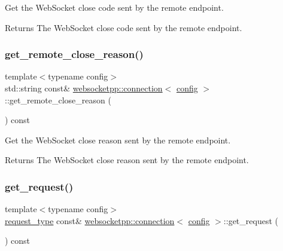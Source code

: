 Get the Web\+Socket close code sent by the remote endpoint. 

\begin{DoxyReturn}{Returns}
The Web\+Socket close code sent by the remote endpoint. 
\end{DoxyReturn}
\mbox{\label{classwebsocketpp_1_1connection_a84cba269aca634a5e7729e88b13a44c7}} 
\subsubsection{\texorpdfstring{get\+\_\+remote\+\_\+close\+\_\+reason()}{get\_remote\_close\_reason()}}
{\footnotesize\ttfamily template$<$typename config$>$ \\
std\+::string const\& \mbox{\hyperlink{classwebsocketpp_1_1connection}{websocketpp\+::connection}}$<$ \mbox{\hyperlink{classconfig}{config}} $>$\+::get\+\_\+remote\+\_\+close\+\_\+reason (\begin{DoxyParamCaption}{ }\end{DoxyParamCaption}) const\hspace{0.3cm}{\ttfamily [inline]}}



Get the Web\+Socket close reason sent by the remote endpoint. 

\begin{DoxyReturn}{Returns}
The Web\+Socket close reason sent by the remote endpoint. 
\end{DoxyReturn}
\mbox{\label{classwebsocketpp_1_1connection_a9d1a9846185e34cbe9ecada12b30e076}} 
\subsubsection{\texorpdfstring{get\+\_\+request()}{get\_request()}}
{\footnotesize\ttfamily template$<$typename config$>$ \\
\mbox{\hyperlink{classwebsocketpp_1_1http_1_1parser_1_1request}{request\+\_\+type}} const\& \mbox{\hyperlink{classwebsocketpp_1_1connection}{websocketpp\+::connection}}$<$ \mbox{\hyperlink{classconfig}{config}} $>$\+::get\+\_\+request (\begin{DoxyParamCaption}{ }\end{DoxyParamCaption}) const\hspace{0.3cm}{\ttfamily [inline]}}



